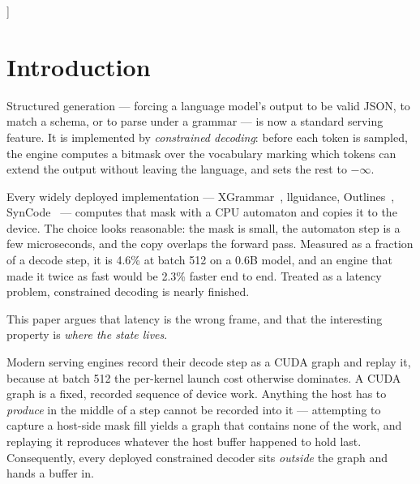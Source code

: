 \documentclass{article}
\begin{document}
\begin{abstract}
91.7\% of valid documents whose object keys are permuted, and its order-free
setting does not enforce \texttt{required} at all, admitting invalid documents
26.3\% of the time. llguidance is sound but fixes property order with no
setting to undo it, so \textbf{engrain is the only engine here that is both
sound and order-free} --- and that, rather than soundness, is the correctness
claim. End to end against XGrammar's order-free setting we are 1.72$\times$
faster while producing 49\% more valid documents, and against llguidance
1.13$\times$ at batch 512. We also report where residency is paid for:
llguidance beats us end to end through batch 128 and serves a single request in
half our time, our cold path to a new schema's first mask is 227\,ms against
its 1.2, and on an 8B model the speed difference vanishes entirely --- a host
fill hides behind a longer forward pass and a device fill cannot --- leaving
only the correctness gap.
\end{abstract}
]

\printAffiliationsAndNotice{}

\section{Introduction}
\label{sec:intro}

Structured generation --- forcing a language model's output to be valid JSON,
to match a schema, or to parse under a grammar --- is now a standard serving
feature. It is implemented by \emph{constrained decoding}: before each token is
sampled, the engine computes a bitmask over the vocabulary marking which tokens
can extend the output without leaving the language, and sets the rest to
$-\infty$.

Every widely deployed implementation --- XGrammar~\cite{dong2024xgrammar},
llguidance, Outlines~\cite{willard2023efficient}, SynCode~\cite{ugare2025syncode}
--- computes that mask with a CPU automaton and copies it to the device. The
choice looks reasonable: the mask is small, the automaton step is a few
microseconds, and the copy overlaps the forward pass. Measured as a fraction of
a decode step, it is 4.6\% at batch 512 on a 0.6B model, and an engine that
made it twice as fast would be 2.3\% faster end to end. Treated as a latency
problem, constrained decoding is nearly finished.

This paper argues that latency is the wrong frame, and that the interesting
property is \emph{where the state lives}.

Modern serving engines record their decode step as a CUDA graph and replay it,
because at batch 512 the per-kernel launch cost otherwise dominates. A CUDA
graph is a fixed, recorded sequence of device work. Anything the host has to
\emph{produce} in the middle of a step cannot be recorded into it --- attempting
to capture a host-side mask fill yields a graph that contains none of the work,
and replaying it reproduces whatever the host buffer happened to hold last.
Consequently, every deployed constrained decoder sits \emph{outside} the graph
and hands a buffer in.
\end{document}
